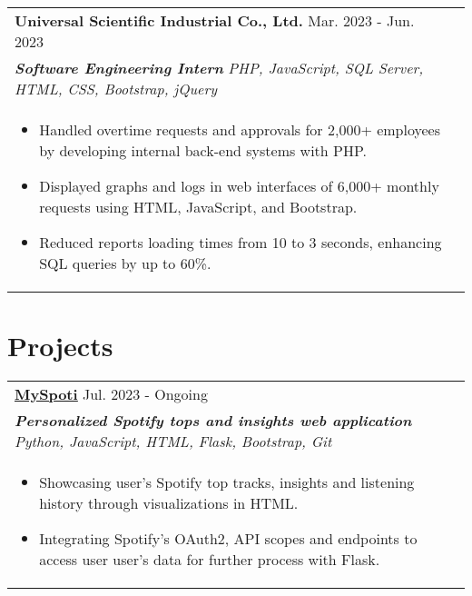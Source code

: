 \documentclass[a4paper,8pt]{article}
\begin{document}
\begin{tabularx}{\linewidth}{ @{}l r@{} }
\color[HTML]{1C033C} \textbf{Universal Scientific Industrial Co., Ltd.} \hfill \color[HTML]{371e77} Mar. 2023 - Jun. 2023 \\[4pt]
\color[HTML]{371e77}\textbf{\textit{Software Engineering Intern}} \hfill \color[HTML]{4B28A4} \textit{PHP, JavaScript, SQL Server, HTML, CSS, Bootstrap, jQuery} \\[5pt]
\begin{minipage}[t]{\linewidth}
    \begin{itemize}[nosep,after=\strut, leftmargin=2em, itemsep=2pt]
        \item Handled overtime requests and approvals for 2,000+ employees by developing internal back-end systems with PHP.
        \item Displayed graphs and logs in web interfaces of 6,000+ monthly requests using HTML, JavaScript, and Bootstrap.
        \item Reduced reports loading times from 10 to 3 seconds, enhancing SQL queries by up to 60\%.
    \end{itemize}
    \end{minipage}
\end{tabularx}

\section{Projects}
\begin{tabularx}{\linewidth}{ @{}l r@{} }
\color[HTML]{1C033C} \textbf{\uline{\href{https://github.com/}{MySpoti}}} \hfill \color[HTML]{371e77} Jul. 2023 - Ongoing \\[4pt]
\color[HTML]{371e77}\textbf{\textit{Personalized Spotify tops and insights web application }} \hfill \color[HTML]{4B28A4} \textit{Python, JavaScript, HTML, Flask, Bootstrap, Git} \\[5pt]
\begin{minipage}[t]{\linewidth}
    \begin{itemize}[nosep,after=\strut, leftmargin=2em, itemsep=2pt]
        \item Showcasing user's Spotify top tracks, insights and listening history through visualizations in HTML.
        \item Integrating Spotify's OAuth2, API scopes and endpoints to access user user's data for further process with Flask.
    \end{itemize}
    \end{minipage}
\end{tabularx}
\end{document}
